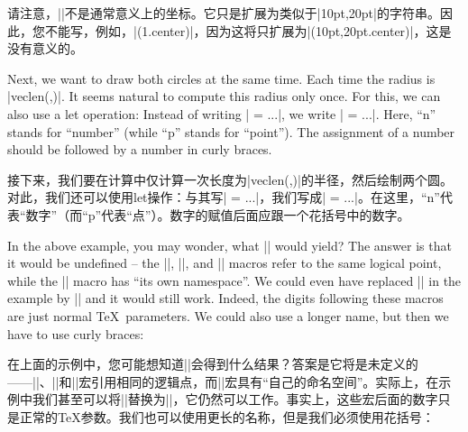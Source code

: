 请注意，||不是通常意义上的坐标。它只是扩展为类似于|10pt,20pt|的字符串。因此，您不能写，例如，|(\p1.center)|，因为这将只扩展为|(10pt,20pt.center)|，这是没有意义的。

Next, we want to draw both circles at the same time. Each time the radius is
|veclen(,)|. It seems natural to compute this radius only once. For this,
we can also use a let operation: Instead of writing | = ...|, we write
| = ...|. Here, ``n'' stands for ``number'' (while ``p'' stands for
``point''). The assignment of a number should be followed by a number in curly
braces.

接下来，我们要在计算中仅计算一次长度为|veclen(,)|的半径，然后绘制两个圆。对此，我们还可以使用let操作：与其写| = ...|，我们写成| = ...|。在这里，“n”代表“数字”（而“p”代表“点”）。数字的赋值后面应跟一个花括号中的数字。

\begin{codeexample}[preamble={\usetikzlibrary{calc}}]
\end{codeexample}
%
In the above example, you may wonder, what || would yield? The answer is
that it would be undefined -- the |\p|, |\x|, and |\y| macros refer to the same
logical point, while the |\n| macro has ``its own namespace''. We could even
have replaced || in the example by || and it would still work. Indeed,
the digits following these macros are just normal \TeX\ parameters. We could
also use a longer name, but then we have to use curly braces:

在上面的示例中，您可能想知道||会得到什么结果？答案是它将是未定义的——|\p|、|\x|和|\y|宏引用相同的逻辑点，而|\n|宏具有“自己的命名空间”。实际上，在示例中我们甚至可以将||替换为||，它仍然可以工作。事实上，这些宏后面的数字只是正常的\TeX 参数。我们也可以使用更长的名称，但是我们必须使用花括号：
%
\begin{codeexample}[preamble={\usetikzlibrary{calc}}]
\end{codeexample}

